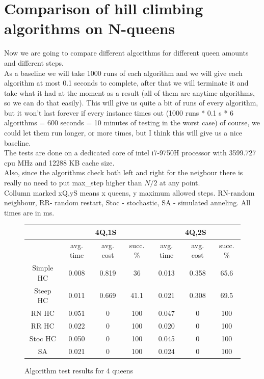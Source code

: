 \documentclass[10pt,a4paper]{article}
\begin{document}
	\section{Comparison of hill climbing algorithms on N-queens}
		Now we are going to compare different algorithms for different queen amounts and different steps. \\
		As a baseline we will take 1000 runs of each algorithm and we will give each algorithm at most 0.1 seconds to complete, after that we will terminate it and take what it had at the moment as a result (all of them are anytime algorithms, so we can do that easily). This will give us quite a bit of runs of every algorithm, but it won't last forever if every instance times out (1000 runs * 0.1 s * 6 algorithms = 600 seconds = 10 minutes of testing in the worst case) of course, we could let them run longer, or more times, but I think this will give us a nice baseline. \\
		The tests are done on a dedicated core of intel i7-9750H processor with 3599.727 cpu MHz and 12288 KB cache size. \\
		Also, since the algorithms check both left and right for the neigbour there is really no need to put max\_step higher than $N/2$ at any point.\\
		Collumn marked xQ,yS means x queens, y maximum allowed steps. RN-random neighbour, RR- random restart, Stoc - stochastic, SA - simulated anneling. All times are in ms.
		\begin{figure}[h!]
			\centering
			\caption{Algorithm test results for 4 queens}
			\begin{tabular}{|c|c|c|c|c|c|c|}
				\hline \hline
				& \multicolumn{3}{c|}{4Q,1S} & \multicolumn{3}{c|}{4Q,2S} \\
				\hline
				&avg. time&avg. cost&succ. \%&avg. time&avg. cost&succ. \% \\
				\hline \hline
				Simple HC&0.008&0.819&36&0.013&0.358&65.6 \\
				\hline
				Steep HC&0.011&0.669&41.1&0.021&0.308&69.5 \\
				\hline
				RN HC&0.051&0&100&0.047&0&100 \\
				\hline
				RR HC&0.022&0&100&0.020&0&100 \\
				\hline
				Stoc HC&0.050&0&100&0.045&0&100 \\
				\hline
				SA&0.021&0&100&0.024&0&100 \\
				\hline
			\end{tabular}
		\end{figure}
\end{document}
